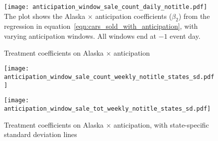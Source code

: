 \documentclass[11pt,letterpaper,oneside]{article}
\begin{document}
\begin{figure}[hbt]
    \caption{Treatment coefficients on Alaska $\times$ anticipation}
    \label{bonusfig:anticipation_window_sale_count_daily}
    \texttt{[image: anticipation\_window\_sale\_count\_daily\_notitle.pdf]}
    {\footnotesize
    The plot shows the Alaska $\times$ anticipation coefficients ($\beta_2$) from the regression in equation~\ref{eqn:cars_sold_with_anticipation}, with varying anticipation windows.
    All windows end at $-1$ event day.
    }
\end{figure}

\begin{figure}[hbt]
	\caption{Treatment coefficients on Alaska $\times$ anticipation, with state-specific standard deviation lines}
	\label{bonusfig:anticipation_window_sale_count_and_tot_weekly_states_sd}
	\texttt{[image: anticipation\_window\_sale\_count\_weekly\_notitle\_states\_sd.pdf]}

	\texttt{[image: anticipation\_window\_sale\_tot\_weekly\_notitle\_states\_sd.pdf]}
\end{figure}
\end{document}
